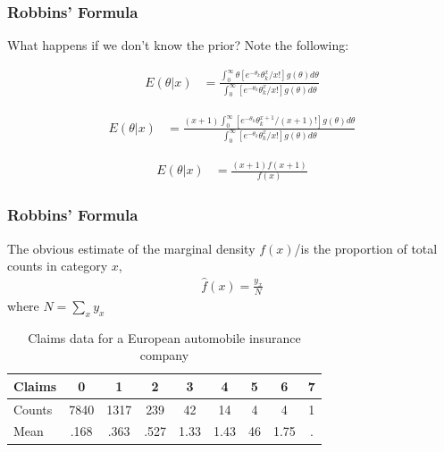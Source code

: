 \documentclass[
  shownotes,
  xcolor={svgnames},
  hyperref={colorlinks,citecolor=DarkBlue,linkcolor=DarkRed,urlcolor=DarkBlue}
  ]{beamer}
\begin{document}
\begin{frame}[fragile]
\frametitle{Robbins' Formula}
What happens if we don't know the prior? Note the following:

\begin{align}
E(\theta|x)&=   \frac{\int_0^{\infty} \theta[e^{-\theta_k} \theta_k^x/x!]g(\theta)d\theta}{\int_0^{\infty} [e^{-\theta_k} \theta_k^x/x!]g(\theta)d\theta}
\end{align}
\medskip

\begin{align}
E(\theta|x)&=   \frac{(x+1) \int_0^{\infty} [e^{-\theta_k} \theta_k^{x+1}/(x+1)!]g(\theta)d\theta}{\int_0^{\infty} [e^{-\theta_k} \theta_k^x/x!]g(\theta)d\theta}
\end{align}

\begin{align}
E(\theta|x)&=   \frac{(x+1) f(x+1)}{f(x)} 
\end{align}

\end{frame}


\begin{frame}[fragile]
\frametitle{Robbins' Formula}
The obvious estimate of the marginal density $f(x)$/is the proportion of total counts in category $x$,
\begin{align}
\hat f(x)= \frac{y_x}{N}
\end{align}
where $N=\sum_x y_x$ 

\begin{table}[H]
\caption{Claims data for a European automobile insurance company}
\begin{tabular}{lcccccccc}
Claims & 0    & 1    & 2   & 3  & 4  & 5 & 6 & 7 \\
\hline
Counts & 7840 & 1317 & 239 & 42 & 14 & 4 & 4 & 1 \\
Mean & .168 & .363 & .527 & 1.33 & 1.43 & 46 & 1.75 & . \\
\end{tabular}
\end{table}

\end{frame}

\end{document}
